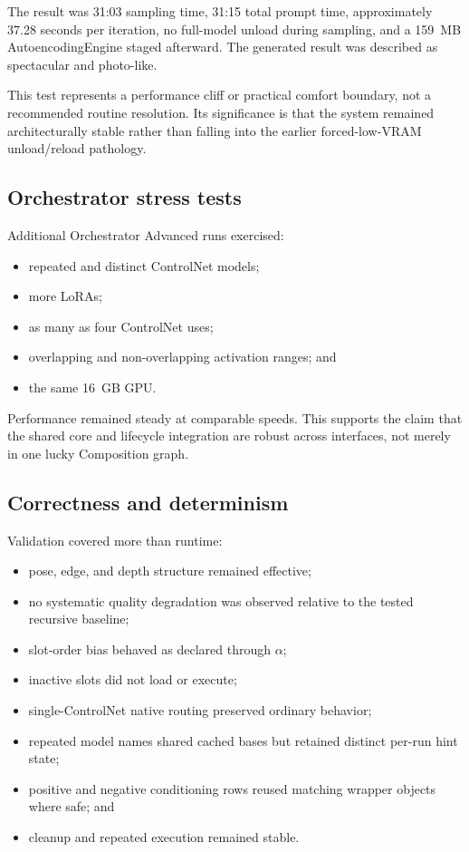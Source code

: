 \documentclass[11pt]{article}
\begin{document}
The result was 31:03 sampling time, 31:15 total prompt time, approximately 37.28 seconds per iteration, no full-model unload during sampling, and a 159~MB AutoencodingEngine staged afterward. The generated result was described as spectacular and photo-like.

This test represents a performance cliff or practical comfort boundary, not a recommended routine resolution. Its significance is that the system remained architecturally stable rather than falling into the earlier forced-low-VRAM unload/reload pathology.

\subsection{Orchestrator stress tests}

Additional Orchestrator Advanced runs exercised:

\begin{itemize}
  \item repeated and distinct ControlNet models;
  \item more LoRAs;
  \item as many as four ControlNet uses;
  \item overlapping and non-overlapping activation ranges; and
  \item the same 16~GB GPU.
\end{itemize}

Performance remained steady at comparable speeds. This supports the claim that the shared core and lifecycle integration are robust across interfaces, not merely in one lucky Composition graph.

\subsection{Correctness and determinism}

Validation covered more than runtime:

\begin{itemize}
  \item pose, edge, and depth structure remained effective;
  \item no systematic quality degradation was observed relative to the tested recursive baseline;
  \item slot-order bias behaved as declared through $\alpha$;
  \item inactive slots did not load or execute;
  \item single-ControlNet native routing preserved ordinary behavior;
  \item repeated model names shared cached bases but retained distinct per-run hint state;
  \item positive and negative conditioning rows reused matching wrapper objects where safe; and
  \item cleanup and repeated execution remained stable.
\end{itemize}
\end{document}
